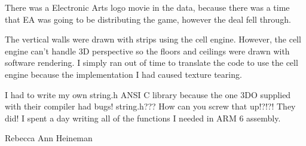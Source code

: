 {\par
There was a Electronic Arts logo movie in the data, because there was a time that EA was going to be distributing the game, however the deal fell through.\\
\par
The vertical walls were drawn with strips using the cell engine. However, the cell engine can't handle 3D perspective so the floors and ceilings were drawn with software rendering. I simply ran out of time to translate the code to use the cell engine because the implementation I had caused texture tearing.\\
\par
I had to write my own string.h ANSI C library because the one 3DO supplied with their compiler had bugs! string.h??? How can you screw that up!?!?! They did! I spent a day writing all of the functions I needed in ARM 6 assembly.}{Rebecca Ann Heineman}
\pagebreak
